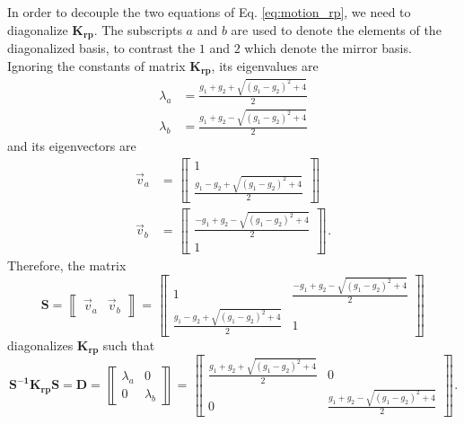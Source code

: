 In order to decouple the two equations of Eq. \ref{eq:motion_rp}, we
need to diagonalize $\mathbf{K_{rp}}$. The subscripts $a$ and $b$ are
used to denote the elements of the diagonalized basis, to contrast the
$1$ and $2$ which denote the mirror basis. Ignoring the constants of
matrix $\mathbf{K_{rp}}$, its eigenvalues are
\begin{align}
\lambda_a &= \frac{g_1 + g_2 + \sqrt{(g_1 - g_2)^2 + 4}}{2} \\
\lambda_b &= \frac{g_1 + g_2 - \sqrt{(g_1 - g_2)^2 + 4}}{2} 
\label{eq:eigenvalues}
\end{align}
and its eigenvectors are
\begin{align}
\vec{v}_a &= \left\llbracket \begin{array}{c} 
1 \\
\frac{g_1 - g_2 + \sqrt{(g_1 - g_2)^2 + 4}} {2} \end{array} \right\rrbracket\\
\vec{v}_b &= \left\llbracket \begin{array}{c}
\frac{ -g_1 + g_2 - \sqrt{(g_1 - g_2)^2 + 4}}{2} \label{eq:eigenvectors}\\
1 \end{array} \right\rrbracket .
\end{align}
Therefore, the matrix 
\begin{equation}
\mathbf{S} = \left\llbracket \begin{array}{cc} 
\vec{v}_a & \vec{v}_b \end{array} \right\rrbracket =
\left\llbracket \begin{array}{cc}
 1 & \frac{-g_1 + g_2 - \sqrt{(g_1 - g_2)^2 + 4}} {2}\\
 \frac{g_1 - g_2 + \sqrt{(g_1 - g_2)^2 + 4}} {2} & 1\end{array} \right\rrbracket
\end{equation}
diagonalizes $\mathbf{K_{rp}}$ such that 
\begin{equation}
\mathbf{S^{-1} K_{rp} S} = \mathbf{D} = \left\llbracket \begin{array}{cc} 
\lambda_a & 0 \\
0 & \lambda_b \end{array} \right\rrbracket = \left\llbracket \begin{array}{cc}
 \frac{g_1 + g_2 + \sqrt{(g_1 - g_2)^2 + 4}}{2}  & 0\\
 0 & \frac{g_1 + g_2 - \sqrt{(g_1 - g_2)^2 + 4}}{2}\end{array}
\right\rrbracket .
\label{eq:diag}
\end{equation}
